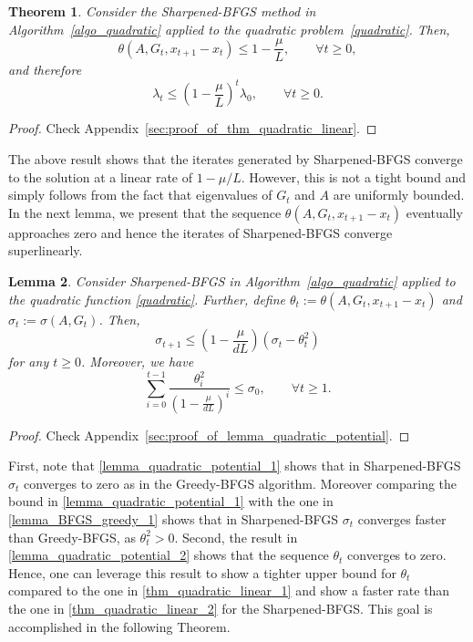 \documentclass[11pt]{article}
\numberwithin{assumption}{section}
\numberwithin{remark}{section}
\newtheorem{theorem}{Theorem}
\numberwithin{theorem}{section}
\newtheorem{lemma}[theorem]{Lemma}
\begin{document}
\begin{theorem}\label{thm_quadratic_linear}
Consider the Sharpened-BFGS method in Algorithm~\ref{algo_quadratic} applied to the quadratic problem~\eqref{quadratic}. Then,
\begin{equation}\label{thm_quadratic_linear_1}
\theta(A, G_t, x_{t + 1} - x_{t})\leq 1 - \frac{\mu}{L}, \qquad \forall t \geq 0,
\end{equation}
and therefore
\begin{equation}\label{thm_quadratic_linear_2}
    \lambda_t \leq \left(1 - \frac{\mu}{L}\right)^{t}\lambda_0, \qquad \forall t \geq 0.
\end{equation}
\end{theorem}

\begin{proof}
Check Appendix~\ref{sec:proof_of_thm_quadratic_linear}.
\end{proof}

The above result shows that the iterates generated by Sharpened-BFGS converge to the solution at a linear rate of $1 - {\mu}/{L}$. However, this is not a tight bound and simply follows from the fact that eigenvalues of $G_t$ and $A$ are uniformly bounded. In the next lemma, we present that the sequence $\theta(A, G_t, x_{t + 1} - x_{t})$ eventually approaches zero and hence the iterates of Sharpened-BFGS converge superlinearly.

\begin{lemma}\label{lemma_quadratic_potential}
Consider Sharpened-BFGS in Algorithm~\ref{algo_quadratic} applied to the quadratic function \eqref{quadratic}. Further, define $\theta_t:=\theta(A, G_t, x_{t + 1} - x_{t})$ and $\sigma_t := \sigma(A, G_t)$. Then, 
\begin{equation}\label{lemma_quadratic_potential_1}
    \sigma_{t+1} \leq \left(1 - \frac{\mu}{dL}\right)\left(\sigma_t - \theta_t^2\right)
\end{equation}
for any $t \geq 0$. Moreover, we have 
\begin{equation}\label{lemma_quadratic_potential_2}
 \sum_{i = 0}^{t - 1}\frac{\theta^2_i}{(1 - \frac{\mu}{d L})^{i}}  \leq \sigma_0, \qquad \forall t \geq 1. 
\end{equation}
\end{lemma}

\begin{proof}
Check Appendix~\ref{sec:proof_of_lemma_quadratic_potential}.
\end{proof}

First, note that \eqref{lemma_quadratic_potential_1} shows that in Sharpened-BFGS $\sigma_t$ converges to zero as in the Greedy-BFGS algorithm. Moreover comparing the bound in \eqref{lemma_quadratic_potential_1} with the one in \eqref{lemma_BFGS_greedy_1} shows that in Sharpened-BFGS $\sigma_t$ converges faster than Greedy-BFGS, as $\theta^2_t > 0$. Second, the result in \eqref{lemma_quadratic_potential_2} shows that the sequence $\theta_t$ converges to zero. Hence, one can leverage this result to show a tighter upper bound for  $\theta_t$ compared to the one in \eqref{thm_quadratic_linear_1} and show  a faster rate than the one in \eqref{thm_quadratic_linear_2} for the Sharpened-BFGS. This goal is accomplished in the following Theorem. 
\end{document}
